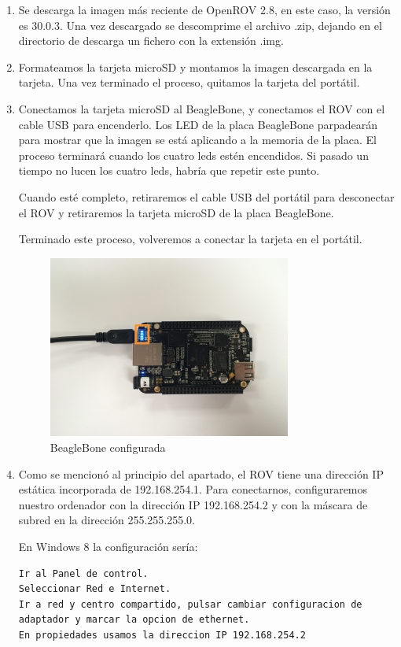 \begin{enumerate}
\item Se descarga la imagen más reciente de OpenROV 2.8, en este caso, la versión es 30.0.3. Una vez descargado se descomprime el archivo .zip, dejando en el directorio de descarga un fichero con la extensión .img.
\item Formateamos la tarjeta microSD y montamos la imagen descargada en la tarjeta. Una vez terminado el proceso, quitamos la tarjeta del portátil.
\item Conectamos la tarjeta microSD al BeagleBone, y conectamos el ROV con el cable USB para encenderlo. Los LED de la placa BeagleBone parpadearán para mostrar que la imagen se está aplicando a la memoria de la placa. El proceso terminará cuando los cuatro leds estén encendidos. Si pasado un tiempo no lucen los cuatro leds, habría que repetir este punto.

Cuando esté completo, retiraremos el cable USB del portátil para desconectar el ROV y retiraremos la tarjeta microSD de la placa BeagleBone.

Terminado este proceso, volveremos a conectar la tarjeta en el portátil.

\begin{figure} [hbtp]
\begin{center}
  \includegraphics[width=8cm]{img/cap3/3_4/BBB}
\end{center}
\caption{BeagleBone configurada}
\label{fig:bbb}
\end{figure}
\item Como se mencionó al principio del apartado, el ROV tiene una dirección IP estática incorporada de 192.168.254.1. Para conectarnos, configuraremos nuestro ordenador con la dirección IP 192.168.254.2 y con la máscara de subred en la dirección 255.255.255.0.

En Windows 8 la configuración sería:

\renewcommand{\lstlistingname}{Configuración}
\begin{lstlisting}[caption= Windows 8, label={lst:config_w8}]
Ir al Panel de control.
Seleccionar Red e Internet.
Ir a red y centro compartido, pulsar cambiar configuracion de adaptador y marcar la opcion de ethernet.
En propiedades usamos la direccion IP 192.168.254.2
\end{lstlisting}


\end{enumerate}
